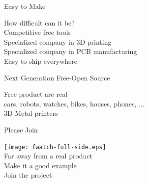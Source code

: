 \documentclass[compress,red]{beamer}
\begin{document}

\begin{frame}{Easy to Make}
  \Large
  \begin{center}
    How difficult can it be? \\
    \vskip 1cm
    Competitive free tools \\
    \vskip 1cm
    Specialized company in 3D printing \\
    \vskip 1cm
    Specialized company in PCB manufacturing \\
    \vskip 1cm
    Easy to ship everywhere
 \end{center}

\end{frame}


\begin{frame}{Next Generation Free-Open Source}
  \Large
  \begin{center}
    Free product are real \\
    \vskip 1cm
    cars, robots, watches, bikes, houses, phones, ... \\
    \vskip 1cm
    3D Metal printers \\
  \end{center}

\end{frame}


\begin{frame}{Please Join}
  \Large
  \begin{center}
    \texttt{[image: fwatch-full-side.eps]} \\
    \vskip 5mm
    Far away from a real product \\
    \vskip 5mm
    Make it a good example \\
    \vskip 5mm
    Join the project \\
  \end{center}

\end{frame}

\end{document}
